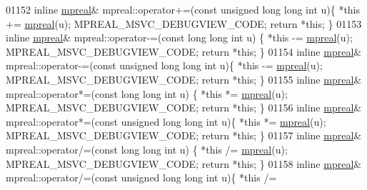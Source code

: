 \begin{DoxyCode}
01152 \textcolor{keyword}{inline} \hyperlink{classmpfr_1_1mpreal}{mpreal}& mpreal::operator+=(\textcolor{keyword}{const} \textcolor{keywordtype}{unsigned} \textcolor{keywordtype}{long} \textcolor{keywordtype}{long} \textcolor{keywordtype}{int} u)\{    *\textcolor{keyword}{this} += 
      \hyperlink{classmpfr_1_1mpreal}{mpreal}(u); MPREAL\_MSVC\_DEBUGVIEW\_CODE; \textcolor{keywordflow}{return} *\textcolor{keyword}{this};    \}
01153 \textcolor{keyword}{inline} \hyperlink{classmpfr_1_1mpreal}{mpreal}& mpreal::operator-=(\textcolor{keyword}{const} \textcolor{keywordtype}{long} \textcolor{keywordtype}{long} \textcolor{keywordtype}{int}  u)        \{    *\textcolor{keyword}{this} -= 
      \hyperlink{classmpfr_1_1mpreal}{mpreal}(u); MPREAL\_MSVC\_DEBUGVIEW\_CODE; \textcolor{keywordflow}{return} *\textcolor{keyword}{this};    \}
01154 \textcolor{keyword}{inline} \hyperlink{classmpfr_1_1mpreal}{mpreal}& mpreal::operator-=(\textcolor{keyword}{const} \textcolor{keywordtype}{unsigned} \textcolor{keywordtype}{long} \textcolor{keywordtype}{long} \textcolor{keywordtype}{int} u)\{    *\textcolor{keyword}{this} -= 
      \hyperlink{classmpfr_1_1mpreal}{mpreal}(u); MPREAL\_MSVC\_DEBUGVIEW\_CODE; \textcolor{keywordflow}{return} *\textcolor{keyword}{this};    \}
01155 \textcolor{keyword}{inline} \hyperlink{classmpfr_1_1mpreal}{mpreal}& mpreal::operator*=(\textcolor{keyword}{const} \textcolor{keywordtype}{long} \textcolor{keywordtype}{long} \textcolor{keywordtype}{int}  u)        \{    *\textcolor{keyword}{this} *= 
      \hyperlink{classmpfr_1_1mpreal}{mpreal}(u); MPREAL\_MSVC\_DEBUGVIEW\_CODE; \textcolor{keywordflow}{return} *\textcolor{keyword}{this};    \}
01156 \textcolor{keyword}{inline} \hyperlink{classmpfr_1_1mpreal}{mpreal}& mpreal::operator*=(\textcolor{keyword}{const} \textcolor{keywordtype}{unsigned} \textcolor{keywordtype}{long} \textcolor{keywordtype}{long} \textcolor{keywordtype}{int} u)\{    *\textcolor{keyword}{this} *= 
      \hyperlink{classmpfr_1_1mpreal}{mpreal}(u); MPREAL\_MSVC\_DEBUGVIEW\_CODE; \textcolor{keywordflow}{return} *\textcolor{keyword}{this};    \}
01157 \textcolor{keyword}{inline} \hyperlink{classmpfr_1_1mpreal}{mpreal}& mpreal::operator/=(\textcolor{keyword}{const} \textcolor{keywordtype}{long} \textcolor{keywordtype}{long} \textcolor{keywordtype}{int}  u)        \{    *\textcolor{keyword}{this} /= 
      \hyperlink{classmpfr_1_1mpreal}{mpreal}(u); MPREAL\_MSVC\_DEBUGVIEW\_CODE; \textcolor{keywordflow}{return} *\textcolor{keyword}{this};    \}
01158 \textcolor{keyword}{inline} \hyperlink{classmpfr_1_1mpreal}{mpreal}& mpreal::operator/=(\textcolor{keyword}{const} \textcolor{keywordtype}{unsigned} \textcolor{keywordtype}{long} \textcolor{keywordtype}{long} \textcolor{keywordtype}{int} u)\{    *\textcolor{keyword}{this} /= 

\end{DoxyCode}

